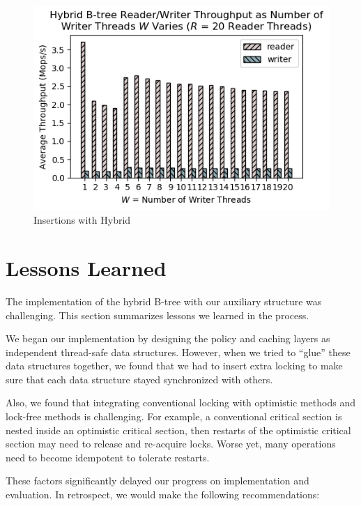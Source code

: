 \documentclass[twocolumn]{article}
\begin{document}
\begin{figure}[ht]
    \centering \includegraphics[width=\columnwidth]{figures/hybrid_r20_w1-20_avg.png}
    \caption{Insertions with Hybrid \label{fig:hyinsert}}
\end{figure}


\section{Lessons Learned}

The implementation of the hybrid B-tree with our auxiliary structure was
challenging. This section summarizes lessons we learned in the process.

We began our implementation by designing the policy and caching layers as
independent thread-safe data structures. However, when we tried to “glue” these
data structures together, we found that we had to insert extra locking to make
sure that each data structure stayed synchronized with others.

Also, we found that integrating conventional locking with optimistic methods
and lock-free methods is challenging. For example, a conventional critical
section is nested inside an optimistic critical section, then restarts of the
optimistic critical section may need to release and re-acquire locks. Worse
yet, many operations need to become idempotent to tolerate restarts.

These factors significantly delayed our progress on implementation and
evaluation. In retrospect, we would make the following recommendations:
\end{document}
